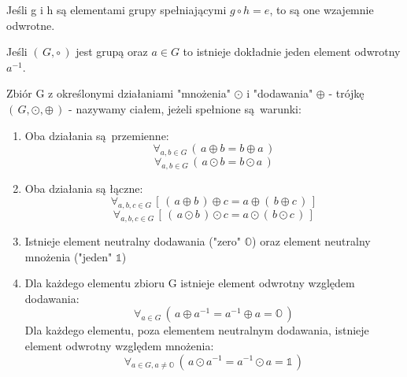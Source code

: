 \begin{theorem}
    Jeśli g i h są elementami grupy spełniającymi $g \circ h = e$, to są one wzajemnie odwrotne.
\end{theorem}

\begin{theorem}
    Jeśli $(\, G, \circ\, )$ jest grupą oraz $a \in G$ to istnieje dokładnie jeden element odwrotny $a^{-1}$.
\end{theorem}

\begin{definition}
    Zbiór G z określonymi działaniami "mnożenia" $\odot$ i "dodawania" $\oplus$ - trójkę $(\, G, \odot, \oplus\,)$ - nazywamy ciałem, jeżeli spełnione są warunki:
    \begin{enumerate}
        \item Oba działania są przemienne:
            \begin{equation*}
                \forall_{a,b \in G} \, (\,a \oplus b = b \oplus a\,)
            \end{equation*}
            \begin{equation*}
                \forall_{a,b \in G} \, (\,a \odot b = b \odot a\,)
            \end{equation*}
        \item Oba działania są łączne:
            \begin{equation*}
                \forall_{a,b,c \in G} \, [\, (\,a \oplus b\,) \oplus c = a \oplus (\,b \oplus c\,)\,]
            \end{equation*}
            \begin{equation*}
                \forall_{a,b,c \in G} \, [\, (\,a \odot b\,) \odot c = a \odot (\,b \odot c\,)\,]
            \end{equation*}
        \item Istnieje element neutralny dodawania ("zero" $\mathds{O}$) oraz element neutralny mnożenia ("jeden" $\mathds{1}$)
        \item Dla każdego elementu zbioru G istnieje element odwrotny względem dodawania:
            \begin{equation*}
                \forall_{a \in G} \, (\, a \oplus a^{-1} = a^{-1} \oplus a = \mathds{O}\,)
            \end{equation*}
            Dla każdego elementu, poza elementem neutralnym dodawania, istnieje element odwrotny względem mnożenia:
            \begin{equation*}
                \forall_{a \in G, a \neq \mathds{O}} \, (\, a \odot a^{-1} = a^{-1} \odot a = \mathds{1}\,)

\end{equation*}
\end{enumerate}
\end{definition}
